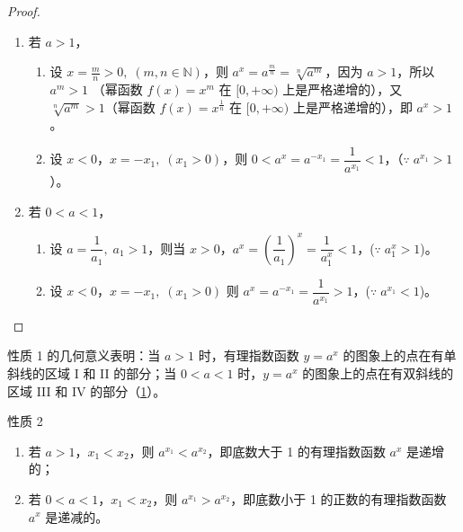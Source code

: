 \begin{proof}
\begin{enumerate}
\item 若 $a>1$，
\begin{enumerate}
  \item 设 $x=\frac{m}{n}>0,\; (m,n\in\mathbb{N})$，则 $a^x=a^{\tfrac{m}{n}}=\sqrt[n]{a^m}$，因为 $a>1$，所以 $a^m>1$ （幂函数 $f(x)=x^m$ 在
$[0,+\infty)$ 上是严格递增的），又 $\sqrt[n]{a^m}>1$（幂函数 $f(x)=x^{\tfrac{1}{n}}$ 在 $[0,+\infty)$ 上是严格递增的），即 $a^x>1$。
\item 设 $x<0$，$x=-x_1,\; (x_1>0)$，则 $0<a^x=a^{-x_1}=\dfrac{1}{a^{x_1}}<1$，（$\because\; a^{x_1}>1$）。
\end{enumerate}
 
\item 若 $0<a<1$，
\begin{enumerate}
  \item 设 $a=\dfrac{1}{a_1},\; a_1>1$，则当 $x>0$，$a^x=\left(\dfrac{1}{a_1}\right)^x=\dfrac{1}{a^x_1}<1$，($\because\; a_1^{x}>1$)。
  \item 设 $x<0$，$x=-x_1,\; (x_1>0)$ 则
$a^x=a^{-x_1}=\dfrac{1}{a^{x_1}}>1$，($\because\; a^{x_1}<1$)。
\end{enumerate}
\end{enumerate}
\end{proof}

\medskip
性质 1 的几何意义表明：当 $a>1$ 时，有理指数函数 $y=a^x$ 的图象上的点在有单斜线的区域 I 和 II 的部分；当 $0<a<1$ 时，$y=a^x$ 的图象上的点在有双斜线的区域 III 和 IV 的部分（\cref{fig:lg_region}）。

\begin{figure}[htp]
  \centering
{}
  \caption{}\label{fig:lg_region}
\end{figure}

\begin{Theorem}{性质 2}
\begin{enumerate}
  \item 若 $a>1$，$x_1<x_2$，则 $a^{x_1}<a^{x_2}$，即底数大于 1 的有理指数函数 $a^x$ 是递增的；
  \item 若 $0<a<1$，$x_1<x_2$，则 $a^{x_1}>a^{x_2}$，即底数小于 1 的正数的有理指数函数 $a^x$ 是递减的。
\end{enumerate}
\end{Theorem}


